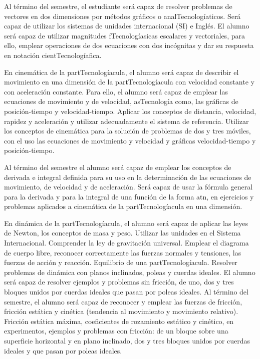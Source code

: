 \begin{syllabus}
\begin{goals}
\item Al término del semestre, el estudiante será capaz de resolver problemas de vectores en dos dimensiones por métodos gráficos o analTecnologíaticos. Será capaz de utilizar los sistemas de unidades internacional (SI) e Inglés. El alumno será capaz de utilizar magnitudes fTecnologíasicas escalares y vectoriales, para ello, emplear operaciones de dos ecuaciones con dos incógnitas y dar su respuesta en notación cientTecnologíafica.
\item En cinemática de la partTecnologíacula, el alumno será capaz de describir el movimiento en una dimensión de la partTecnologíacula con velocidad constante y con aceleración constante. Para ello, el alumno será capaz de emplear las ecuaciones de movimiento y de velocidad, asTecnología como, las gráficas de posición-tiempo y velocidad-tiempo. Aplicar los conceptos de distancia, velocidad, rapidez y aceleración y utilizar adecuadamente el sistema de referencia. Utilizar los conceptos de cinemática para la solución de problemas de dos y tres móviles, con el uso las ecuaciones de movimiento y velocidad y gráficas velocidad-tiempo y posición-tiempo.
\item Al término del semestre el alumno será capaz de emplear los conceptos de derivada e integral definida para su uso en la determinación de las ecuaciones de movimiento, de velocidad y de aceleración. Será capaz de usar la fórmula general para la derivada y para la integral de una función de la forma atn, en ejercicios y problemas aplicados a cinemática de la partTecnologíacula en una dimensión.
\item En dinámica de la partTecnologíacula, el alumno será capaz de aplicar las leyes de Newton, los conceptos de masa y peso. Utilizar las unidades en el Sistema Internacional. Comprender la ley de gravitación universal. Emplear el diagrama de cuerpo libre, reconocer correctamente las fuerzas normales y tensiones, las fuerzas de acción y reacción. Equilibrio de una partTecnologíacula. Resolver problemas de dinámica con planos inclinados, poleas y cuerdas ideales. El alumno será capaz de resolver ejemplos y problemas sin fricción, de uno, dos y tres bloques unidos por cuerdas ideales que pasan por poleas ideales. Al término del semestre, el alumno será capaz de reconocer y emplear las fuerzas de fricción, fricción estática y cinética (tendencia al movimiento y movimiento relativo). Fricción estática máxima, coeficientes de rozamiento estático y cinético, en experimentos, ejemplos y problemas con fricción: de un bloque sobre una superficie horizontal y en plano inclinado, dos y tres bloques unidos por cuerdas ideales y que pasan por poleas ideales.
\end{goals}


\end{syllabus}
